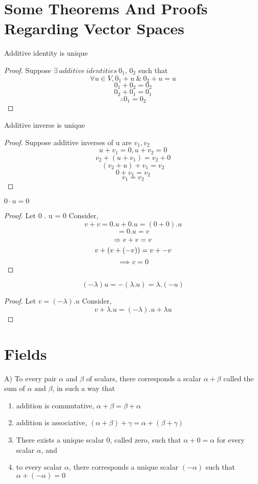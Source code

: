 \documentclass{report}
\begin{document}
    \section{Some Theorems And Proofs Regarding Vector Spaces}
\begin{theorem}
    Additive identity is unique
\end{theorem}
    \begin{proof}
        Suppose $\exists \ additive \ identities \ 0_1$, $0_2$ such that
        \[\forall u \in V, 0_1 + u \ \& \ 0_2 + u = u\]
        \[0_1 + 0_2 = 0_2\]
        \[0_2 + 0_1 = 0_1\]
        \[\therefore 0_1 = 0_2\]
    \end{proof}
\begin{theorem}
    Additive inverse is unique
\end{theorem}
    \begin{proof}
        Suppose additive inverses of u are $v_1, v_2$
        \[u + v_1 = 0, u + v_2 = 0\]
        \[v_2 + (u+v_1) = v_2 + 0\]
        \[(v_2 + u) + v_1 = v_2\]
        \[0 + v_1 = v_2\]
        \[v_1 = v_2\]
        \end{proof}
\begin{theorem}
    $0\cdot u = 0$
\end{theorem}
\begin{proof}

   Let 0 . u = 0 
   Consider,
   \[
   v + v = 0.u + 0.u = (0+0).u
   \]
\[
	= 0.u = v
\]	
\[
	\implies v+v = v \\
\]
\[
       v+(v + (-v)) = v + -v \\
\]
\[
	\implies v = 0 
\]
\end{proof}
\begin{theorem}
	\[
	   (-\lambda)u = -(\lambda.u) = \lambda . (-u)
	\]
\end{theorem}
\begin{proof}
	Let $v = (-\lambda).u$
	Consider,
	\begin{displaymath}
	v + \lambda. u = (-\lambda).u + \lambda u	
	\end{displaymath}
	
\end{proof}

\section{Fields}
A) To every pair $\alpha$ and $\beta$ of scalars, there corresponds a scalar $\alpha + \beta$ called the sum of $\alpha \text{ and } \beta$, in such a way that 
\begin{enumerate}
	\item addition is commutative, $\alpha + \beta = \beta + \alpha$
	\item addition is associative, $(\alpha + \beta)+\gamma = \alpha + (\beta + \gamma)$   
	\item There exists a unique scalar 0, called zero, such that $\alpha + 0 = \alpha$ for every scalar $\alpha$, and 
	\item to every scalar $\alpha$, there corresponds a unique scalar $(-\alpha)$ such that $\alpha + (-\alpha) = 0$ 
\end{enumerate}
\end{document}
